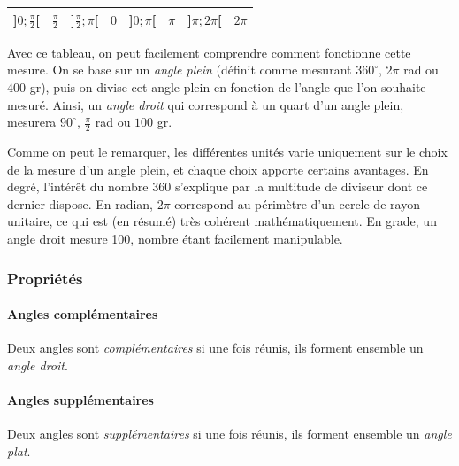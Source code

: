\documentclass[a4paper, twoside]{article}
\begin{document}
\begin{center}
{\begin{tabular}{|c|c|c||c|c|c|c|c|}
					\hline
			]$0 ; \frac{\pi}{2}$[                                 & $\frac{\pi}{2}$                                        & ]$\frac{\pi}{2} ; \pi$[                               & $0$                                                        & ]$0 ; \pi$[                                               & $\pi$                                                 & ]$\pi ; 2\pi$[                                            & $2\pi$                                                 \\
			\hline
		\end{tabular}
	}
\end{center}

Avec ce tableau, on peut facilement comprendre comment fonctionne cette mesure.
On se base sur un \emph{angle plein} (définit comme mesurant \(360^\circ\), \(2\pi\) rad ou \(400\) gr),
puis on divise cet angle plein en fonction de l'angle que l'on souhaite mesuré.
Ainsi, un \emph{angle droit} qui correspond à un quart d'un angle plein,
mesurera \(90^\circ\), \(\frac{\pi}{2}\) rad ou \(100\) gr.

Comme on peut le remarquer, les différentes unités varie uniquement sur le choix de la mesure
d'un angle plein, et chaque choix apporte certains avantages. En degré, l'intérêt du nombre 360 s'explique
par la multitude de diviseur dont ce dernier dispose. En radian, $2\pi$ correspond au périmètre
d'un cercle de rayon unitaire, ce qui est (en résumé) très cohérent mathématiquement. En grade,
un angle droit mesure 100, nombre étant facilement manipulable.

\subsubsection*{Propriétés}

\paragraph*{Angles complémentaires}

Deux angles sont \emph{complémentaires} si une fois réunis, ils forment ensemble un \textit{angle droit}.

\paragraph*{Angles supplémentaires}

Deux angles sont \emph{supplémentaires} si une fois réunis, ils forment ensemble un \textit{angle plat}.
\end{document}
